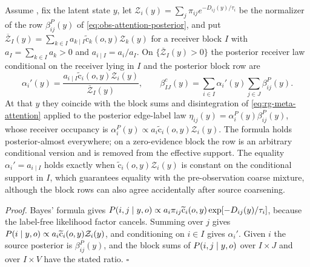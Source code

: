 Assume , fix the latent state $y$, let
$\mathcal Z_i(y)=\sum_j\pi_{ij}e^{-D_{ij}(y)/\tau_i}$ be the normalizer of the row
$\beta^P_{ij}(y)$ of \eqref{eq:obs-attention-posterior}, and put
$\overline{\mathcal Z}_I(y)=\sum_{k\in I}a_{k\mid I}\widetilde{\mathrm c}_k(o,y)\mathcal Z_k(y)$
for a receiver block $I$ with $a_I=\sum_{k\in I}a_k>0$ and $a_{i\mid I}=a_i/a_I$.
On $\{\overline{\mathcal Z}_I(y)>0\}$ the posterior receiver law conditional on the
receiver lying in $I$ and the posterior block row are
\begin{equation}
\alpha_i'(y)=\frac{a_{i\mid I}\widetilde{\mathrm c}_i(o,y)\mathcal Z_i(y)}{\overline{\mathcal Z}_I(y)},
\qquad
\beta^c_{IJ}(y)=\sum_{i\in I}\alpha_i'(y)\sum_{j\in J}\beta^P_{ij}(y).
\label{eq:rg-attention-evidence-weights}
\end{equation}
At that $y$ they coincide with the block sums and disintegration of
\eqref{eq:rg-meta-attention} applied to the posterior edge-label law
$\eta_{ij}(y)=\alpha^P_i(y)\beta^P_{ij}(y)$, whose receiver occupancy is
$\alpha^P_i(y)\propto a_i\widetilde{\mathrm c}_i(o,y)\mathcal Z_i(y)$. The formula holds
posterior-almost everywhere; on a zero-evidence block the row is an arbitrary
conditional version and is removed from the effective support. The equality
$\alpha_i'=a_{i\mid I}$ holds exactly when $\widetilde{\mathrm c}_i(o,y)\mathcal Z_i(y)$ is
constant on the conditional support in $I$, which guarantees equality with the
pre-observation coarse mixture, although the block rows can also agree accidentally
after source coarsening. 

\noindent\emph{Proof.}
Bayes' formula gives $P(i,j\mid y,o)\propto a_i\pi_{ij}\widetilde{\mathrm
c}_i(o,y)\exp[-D_{ij}(y)/\tau_i]$, because the label-free likelihood factor cancels.
Summing over $j$ gives $P(i\mid y,o)\propto a_i\widetilde{\mathrm c}_i(o,y)\mathcal
Z_i(y)$, and conditioning on $i\in I$ gives $\alpha_i'$. Given $i$ the source
posterior is $\beta^P_{ij}(y)$, and the block sums of $P(i,j\mid y,o)$ over
$I\times J$ and over $I\times V$ have the stated ratio. $\square$

